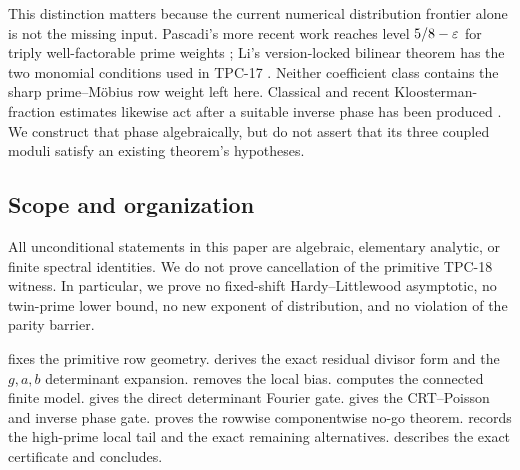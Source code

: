 This distinction matters because the current numerical distribution
frontier alone is not the missing input.  Pascadi's more recent work
reaches level \(5/8-\varepsilon\) for triply well-factorable prime weights
\citep{Pascadi2025Distribution}; Li's version-locked bilinear theorem
has the two monomial conditions used in TPC-17
\citep{Li2026v6}.  Neither coefficient class contains the sharp
prime--M\"obius row weight left here.  Classical and recent
Kloosterman-fraction estimates likewise act after a suitable inverse
phase has been produced \citep{DukeFriedlanderIwaniec1997,
BettinChandee2018,Wright2026}.  We construct that
phase algebraically, but do not assert that its three coupled moduli
satisfy an existing theorem's hypotheses.

\subsection{Scope and organization}

All unconditional statements in this paper are algebraic, elementary
analytic, or finite spectral identities.  We do not prove cancellation
of the primitive TPC-18 witness.  In particular, we prove no
fixed-shift Hardy--Littlewood asymptotic, no twin-prime lower bound, no
new exponent of distribution, and no violation of the parity barrier.

 fixes the primitive row geometry.
 derives the exact residual divisor form and
the \(g,a,b\) determinant expansion.   removes the
local bias.   computes the connected finite
model.   gives the direct determinant
Fourier gate.   gives the CRT--Poisson and inverse
phase gate.   proves the rowwise componentwise no-go
theorem.
 records the high-prime local tail and the exact
remaining alternatives.   describes the exact
certificate and concludes.
